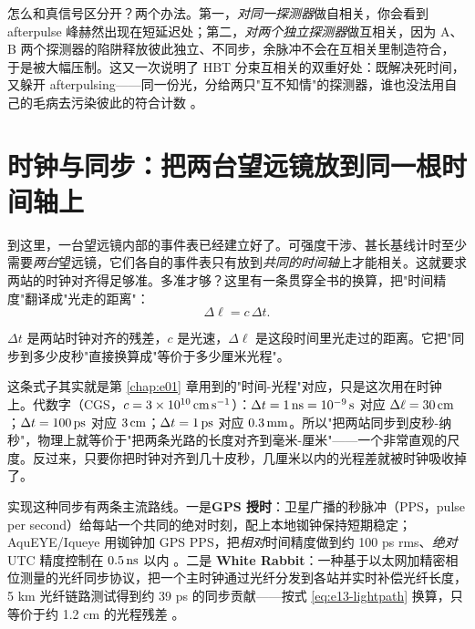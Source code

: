 怎么和真信号区分开？两个办法。第一，\emph{对同一探测器}做自相关，你会看到 afterpulse 峰赫然出现在短延迟处；第二，\emph{对两个独立探测器}做互相关，因为 A、B 两个探测器的陷阱释放彼此独立、不同步，余脉冲不会在互相关里制造符合，于是被大幅压制。这又一次说明了 HBT 分束互相关的双重好处：既解决死时间，又躲开 afterpulsing——同一份光，分给两只"互不知情"的探测器，谁也没法用自己的毛病去污染彼此的符合计数 \citep{1957RSPSA.242..300B,1996ApOpt..35.1956C,2020RScI...91a3108W}。

\section{时钟与同步：把两台望远镜放到同一根时间轴上}
\label{sec:e13-clock}

到这里，一台望远镜内部的事件表已经建立好了。可强度干涉、甚长基线计时至少需要\emph{两台}望远镜，它们各自的事件表只有放到\emph{共同的时间轴}上才能相关。这就要求两站的时钟对齐得足够准。多准才够？这里有一条贯穿全书的换算，把"时间精度"翻译成"光走的距离"：
\begin{equation}
  \Delta\ell = c\,\Delta t .
  \label{eq:e13-lightpath}
\end{equation}
\begin{formulaexplain}
\(\Delta t\) 是两站时钟对齐的残差，\(c\) 是光速，\(\Delta\ell\) 是这段时间里光走过的距离。它把"同步到多少皮秒"直接换算成"等价于多少厘米光程"。
\end{formulaexplain}
这条式子其实就是第 \ref{chap:e01} 章用到的"时间-光程"对应，只是这次用在时钟上。代数字（CGS，\(c=3\times10^{10}\,{\rm cm\,s^{-1}}\)）：\(\Delta t=1\,{\rm ns}=10^{-9}\,{\rm s}\) 对应 \(\Delta\ell=30\,{\rm cm}\)；\(\Delta t=100\,{\rm ps}\) 对应 \(3\,{\rm cm}\)；\(\Delta t=1\,{\rm ps}\) 对应 \(0.3\,{\rm mm}\)。所以"把两站同步到皮秒-纳秒"，物理上就等价于"把两条光路的长度对齐到毫米-厘米"——一个非常直观的尺度。反过来，只要你把时钟对齐到几十皮秒，几厘米以内的光程差就被时钟吸收掉了。

实现这种同步有两条主流路线。一是\textbf{GPS 授时}：卫星广播的秒脉冲（PPS，pulse per second）给每站一个共同的绝对时刻，配上本地铷钟保持短期稳定；AquEYE/Iqueye 用铷钟加 GPS PPS，把\emph{相对}时间精度做到约 100 ps rms、\emph{绝对} UTC 精度控制在 \(0.5\,{\rm ns}\) 以内 \citep{2009A&A...508..531N,2015SPIE.9504E..0CZ}。二是 \textbf{White Rabbit}：一种基于以太网加精密相位测量的光纤同步协议，把一个主时钟通过光纤分发到各站并实时补偿光纤长度，5 km 光纤链路测试得到约 39 ps 的同步贡献——按式 \eqref{eq:e13-lightpath} 换算，只等价于约 1.2 cm 的光程残差 \citep{2013NIMPA.725..187J,2020RScI...91a3108W}。

